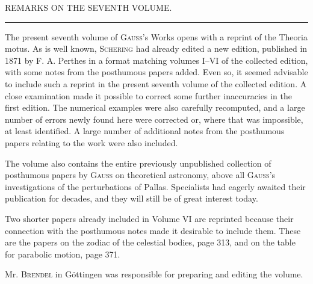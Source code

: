 \clearpage
\begingroup
{}
\renewcommand{\headrulewidth}{0pt}
\begin{center}\large REMARKS ON THE SEVENTH VOLUME.\end{center}
\begin{center}\rule{.09\linewidth}{.4pt}\end{center}

\par\noindent\hspace*{\parindent}The present seventh volume of \textsc{Gauss}’s Works opens with a reprint of the Theoria motus.
As is well known, \textsc{Schering} had already edited a new edition, published in 1871 by F. A. Perthes in a
format matching volumes I--VI of the collected edition, with some notes from the posthumous
papers added. Even so, it seemed advisable to include such a reprint in the
present seventh volume of the collected edition. A close examination made it possible to correct some
further inaccuracies in the first edition. The numerical examples were also
carefully recomputed, and a large number of errors newly found here were corrected
or, where that was impossible, at least identified. A large number of additional notes from
the posthumous papers relating to the work were also included.

\par\noindent\hspace*{\parindent}The volume also contains the entire previously unpublished collection of posthumous papers
by \textsc{Gauss} on theoretical astronomy, above all \textsc{Gauss}’s investigations of the perturbations of Pallas.
Specialists had eagerly awaited their publication for decades, and they will still be
of great interest today.

\par\noindent\hspace*{\parindent}Two shorter papers already included in Volume VI are reprinted
because their connection with the posthumous notes made it desirable to include them. These are the
papers on the zodiac of the celestial bodies, page 313, and on the table for parabolic motion,
page 371.

\par\noindent\hspace*{\parindent}Mr. \textsc{Brendel} in Göttingen was responsible for preparing and editing the volume.

